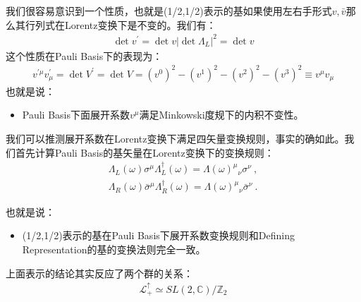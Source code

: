 \bigskip
{}

我们很容易意识到一个性质，也就是(1/2,1/2)表示的基如果使用左右手形式$ v, \bar{v} $那么其行列式在Lorentz变换下是不变的。我们有：
\begin{align}
  \det v^{\prime}=\det v|\det\Lambda_L|^2=\det v
\end{align}
这个性质在Pauli Basis下的表现为：
\begin{align}
  v^{\prime\mu}v_\mu^{\prime}=\det V^{\prime}=\det V=(v^0)^2-(v^1)^2-(v^2)^2-(v^3)^2\equiv v^\mu v_\mu
\end{align}
也就是说：
\begin{itemize}
  \item Pauli Basis下面展开系数$ v^\mu $满足Minkowski度规下的内积不变性。
\end{itemize}

\bigskip
{}

我们可以推测展开系数在Lorentz变换下满足四矢量变换规则，事实的确如此。我们首先计算Pauli Basis的基矢量在Lorentz变换下的变换规则：
\begin{align}
  \Lambda_L(\omega)\sigma^\mu\Lambda_L^\dagger(\omega)=\Lambda(\omega)^\mu{}_\nu \sigma^\nu\mathrm{~,} \\ 
  \Lambda_R(\omega)\bar{\sigma}^\mu\Lambda_R^\dagger(\omega)=\Lambda(\omega)^\mu{}_\nu \bar{\sigma}^\nu\mathrm{~.}
\end{align}

也就是说：
\begin{itemize}
  \item (1/2,1/2)表示的基在Pauli Basis下展开系数变换规则和Defining Representation的基的变换法则完全一致。
\end{itemize}

\bigskip
{}

上面表示的结论其实反应了两个群的关系：
\begin{align}
  \mathscr{L}_+^\uparrow\simeq SL(2,\mathbb{C})/\mathbb{Z}_2
\end{align}

